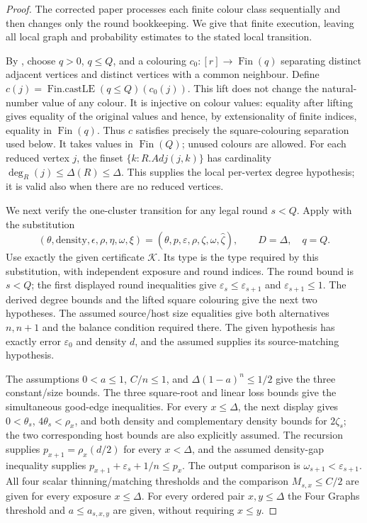 \begin{proof}
The corrected paper processes each finite colour class sequentially and
then changes only the round bookkeeping. We give that finite execution,
leaving all local graph and probability estimates to the stated local
transition.

By , choose $q>0$, $q\leq Q$, and a
colouring $c_0:[r]\to\operatorname{Fin}(q)$ separating distinct adjacent
vertices and distinct vertices with a common neighbour. Define
$c(j)=\operatorname{Fin.castLE}(q\leq Q)(c_0(j))$.
This lift does not change the natural-number value of any colour.
It is injective on colour values: equality after lifting gives equality
of the original values and hence, by extensionality of finite indices,
equality in $\operatorname{Fin}(q)$. Thus $c$ satisfies precisely the
square-colouring separation used below. It takes values in
$\operatorname{Fin}(Q)$; unused colours are allowed. For each reduced
vertex $j$, the finset $\{k:R.Adj(j,k)\}$ has cardinality
$\deg_R(j)\leq\Delta(R)\leq\Delta$. This supplies the local per-vertex
degree hypothesis; it is valid also when there are no reduced vertices.

We next verify the one-cluster transition for any legal round $s<Q$.
Apply  with the substitution
\[
 (\theta,\mathrm{density},\epsilon,\rho,\eta,\omega,\xi)
       =(\theta,p,\varepsilon,\rho,\zeta,\omega,\widehat\zeta),
 \qquad D=\Delta,\quad q=Q.
\]
Use exactly the given certificate $\mathcal K$. Its type is the
 type required by this
substitution, with independent exposure and round indices.
The round bound is $s<Q$; the first displayed round inequalities give
$\varepsilon_s\leq\varepsilon_{s+1}$ and $\varepsilon_{s+1}\leq1$.
The derived degree bounds and the lifted square colouring give the next
two hypotheses. The assumed source/host size equalities give both
alternatives $n,n+1$ and the balance condition required there.
The given  hypothesis has exactly error
$\varepsilon_0$ and density $d$, and the assumed
 supplies its source-matching hypothesis.

The assumptions $0<a\leq1$, $C/n\leq1$, and
$\Delta(1-a)^n\leq1/2$ give the three constant/size bounds.
The three square-root and linear loss bounds give the simultaneous
good-edge inequalities. For every $x\leq\Delta$, the next display
gives $0<\theta_s$, $4\theta_s<\rho_x$, and both density and complementary
density bounds for $2\zeta_s$; the two corresponding host bounds
are also explicitly assumed. The recursion supplies
$p_{x+1}=\rho_x(d/2)$ for every $x<\Delta$, and the assumed density-gap
inequality supplies $p_{x+1}+\varepsilon_s+1/n\leq p_x$.
The output comparison is $\omega_{s+1}<\varepsilon_{s+1}$.
All four scalar thinning/matching thresholds and the comparison
$M_{s,x}\leq C/2$ are given for every exposure $x\leq\Delta$.
For every ordered pair $x,y\leq\Delta$ the Four Graphs threshold and
$a\leq a_{s,x,y}$ are given, without requiring $x\leq y$.


\end{proof}
